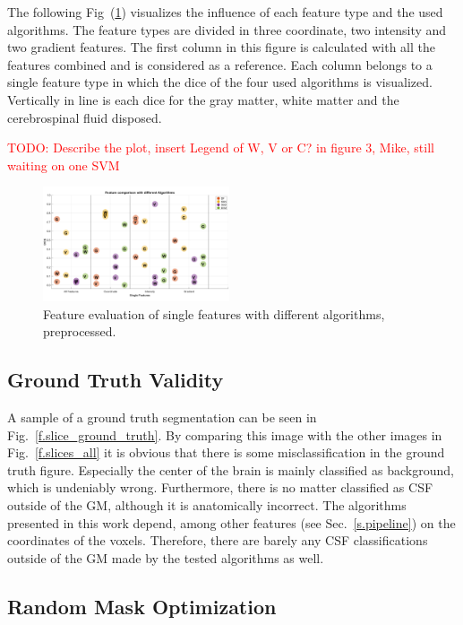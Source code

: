 \documentclass[journal]{IEEEtran}
\newcommand\TODO[1]{\textcolor{red}{TODO: #1}}
\begin{document}
The following Fig~(\ref{FeatEval}) visualizes the influence of each feature type and the used algorithms. The feature types are divided in three coordinate, two intensity and two gradient features. The first column in this figure is calculated with all the features combined and is considered as a reference. Each column belongs to a single feature type in which the dice of the four used algorithms is visualized. Vertically in line is each dice for the gray matter, white matter and the cerebrospinal fluid disposed.

\TODO{Describe the plot, insert Legend of W, V or C? in figure 3, Mike, still waiting on one SVM}
\begin{figure}[h]
	\centering
	\includegraphics[width=0.49\textwidth]{images/FeatureEvaluation}
	\caption{Feature evaluation of single features with different algorithms, preprocessed.}
	\label{FeatEval}
\end{figure}




\subsection{Ground Truth Validity}

A sample of a ground truth segmentation can be seen in Fig.~\ref{f.slice_ground_truth}. By comparing this image with the other images in Fig.~\ref{f.slices_all} it is obvious that there is some misclassification in the ground truth figure. Especially the center of the brain is mainly classified as background, which is undeniably wrong. Furthermore, there is no matter classified as CSF outside of the GM, although it is anatomically incorrect. The algorithms presented in this work depend, among other features (see Sec.~\ref{s.pipeline}) on the coordinates of the voxels. Therefore, there are barely any CSF classifications outside of the GM made by the tested algorithms as well.



\subsection{Random Mask Optimization}
\end{document}

